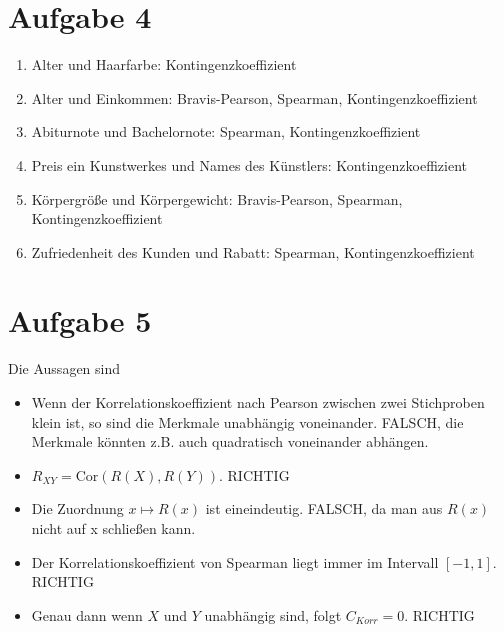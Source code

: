 \documentclass{article}
\begin{document}
	\section*{Aufgabe 4}
	\begin{enumerate}[label=(\alph*)]
		\item Alter und Haarfarbe: Kontingenzkoeffizient
		\item Alter und Einkommen: Bravis-Pearson, Spearman, Kontingenzkoeffizient
		\item Abiturnote und Bachelornote: Spearman, Kontingenzkoeffizient
		\item Preis ein Kunstwerkes und Names des Künstlers: Kontingenzkoeffizient
		\item Körpergröße und Körpergewicht: Bravis-Pearson, Spearman, Kontingenzkoeffizient
		\item Zufriedenheit des Kunden und Rabatt: Spearman, Kontingenzkoeffizient
	\end{enumerate}

	\section*{Aufgabe 5}
	Die Aussagen sind
	\begin{itemize}
		\item Wenn der Korrelationskoeffizient nach Pearson zwischen zwei Stichproben klein ist, so sind die Merkmale unabhängig voneinander. FALSCH, die Merkmale könnten z.B. auch quadratisch voneinander abhängen.
		\item $R_{XY}=\text{Cor}(R(X),R(Y))$. RICHTIG
		\item Die Zuordnung $x\mapsto R(x)$ ist eineindeutig. FALSCH, da man aus $R(x)$ nicht auf x schließen kann.
		\item Der Korrelationskoeffizient von Spearman liegt immer im Intervall $[-1,1]$. RICHTIG
		\item Genau dann wenn $X$ und $Y$ unabhängig sind, folgt $C_{Korr}=0$. RICHTIG
	\end{itemize}
	
\end{document}
